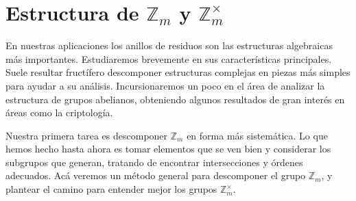 %

\chapter{\protect\boldmath
	    Estructura \texorpdfstring{de $\mathbb{Z}_m$ y $\mathbb{Z}^\times_m$}
				      {algebraica de clases de congruencia}%
	  \protect\unboldmath}
\label{cha:estructura-Zm}

  En nuestras aplicaciones los anillos de residuos
  son las estructuras algebraicas más importantes.
  Estudiaremos brevemente en sus características principales.
  Suele resultar fructífero descomponer estructuras complejas
  en piezas más simples para ayudar a su análisis.
  Incursionaremos un poco en el área
  de analizar la estructura de grupos abelianos,%
  obteniendo algunos resultados de gran interés
  en áreas como la criptología.



  Nuestra primera tarea es descomponer \(\mathbb{Z}_m\)
  en forma más sistemática.
  Lo que hemos hecho hasta ahora es tomar elementos que se ven bien
  y considerar los subgrupos que generan,
  tratando de encontrar intersecciones y órdenes adecuados.
  Acá veremos un método general
  para descomponer el grupo \(\mathbb{Z}_m\),
  y plantear el camino para entender mejor
  los grupos \(\mathbb{Z}^\times_m\).

